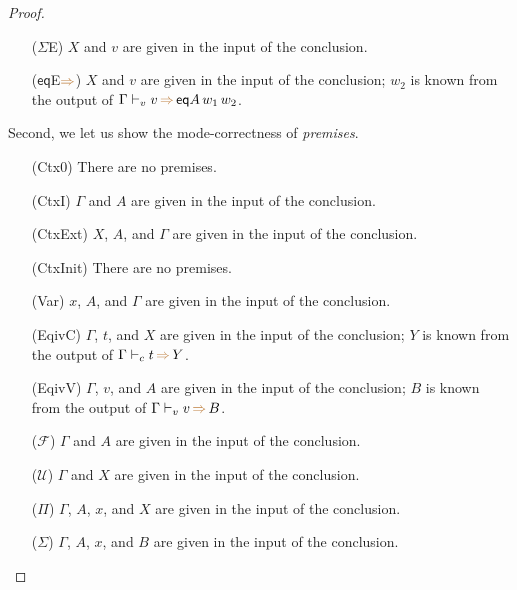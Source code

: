 \documentclass[a4,natbib=false]{article}
\newcommand{\ctov}{\mathcal{U}}
\newcommand{\vtoc}{\mathcal{F}}
\newcommand{\eqtype}[3]{\mathsf{eq}{#1}\,{#2}\,{#3}}
\newcommand{\infers}{{\color{brown} \Rightarrow}}
\newcommand{\judgecInfer}[3]{{#1} \vdash_{c} {#2} \, \infers \, {#3}}
\newcommand{\judgevInfer}[3]{{#1} \vdash_{v} {#2} \, \infers \, {#3}}
\begin{document}
\begin{proof}
\begin{multicols}{2}
\begin{itemize}
  \item[($\Sigma$E)]
    $X$ and $v$ are given in the input of the conclusion.

  \item[($\mathsf{eq}$E$\infers$)]
    $X$ and $v$ are given in the input of the conclusion;
    $w_2$ is known from the output of $\judgevInfer{\Gamma}{v}{\eqtype{A}{w_1}{w_2}}$.
  \end{itemize}
  \end{multicols}

  Second, we let us show the mode-correctness of \emph{premises}.
  
  \newcommand{\fromconcl}{given in the input of the conclusion}

  \begin{multicols}{2}
  \begin{itemize}
      \item[(Ctx0)]
        There are no premises.

      \item[(CtxI)]
        $\Gamma$ and $A$ are \fromconcl.

      \item[(CtxExt)]
        $X$, $A$, and $\Gamma$ are \fromconcl.

      \item[(CtxInit)]
        There are no premises. 

      \item[(Var)]
        $x$, $A$, and $\Gamma$ are \fromconcl.

      \item[(EqivC)]
        $\Gamma$, $t$, and $X$ are \fromconcl;
        $Y$ is known from the output of $\judgecInfer{\Gamma}{t}{Y}$.

      \item[(EqivV)]
        $\Gamma$, $v$, and $A$ are \fromconcl;
        $B$ is known from the output of $\judgevInfer{\Gamma}{v}{B}$.

      \item[($\vtoc$)]
        $\Gamma$ and $A$ are \fromconcl.

      \item[($\ctov$)]
        $\Gamma$ and $X$ are \fromconcl.

      \item[($\Pi$)]
        $\Gamma$, $A$, $x$, and $X$ are \fromconcl.

      \item[($\Sigma$)]
        $\Gamma$, $A$, $x$, and $B$ are \fromconcl.


\end{itemize}
\end{multicols}
\end{proof}
\end{document}
